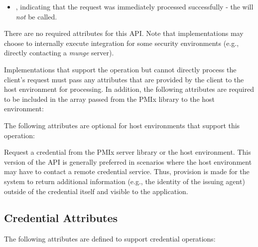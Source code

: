 \returnsimplenb

\returnstart
\begin{itemize}
\item {}, indicating that the request was immediately processed successfully - the  will \textit{not} be called.
\end{itemize}
\returnend

\reqattrstart
There are no required attributes for this \ac{API}. Note that implementations may choose to internally
execute integration for some security environments (e.g., directly
contacting a \textit{munge} server).

Implementations that support the operation but cannot directly process the client's request must pass any attributes that are provided by the client to the host environment for processing. In addition, the following attributes are required to be included in the  array passed from the \ac{PMIx} library to the host environment:


\reqattrend

\optattrstart
The following attributes are optional for host environments that support this operation:


\optattrend

\descr

Request a credential from the \ac{PMIx} server library or the host environment.  This version of the \ac{API} is generally preferred in scenarios where the host environment may have to contact a remote credential service. Thus, provision is made for the system to return additional information (e.g., the identity of the issuing agent) outside of the credential itself and visible to the application.

\subsection{Credential Attributes}
\label{chap:api_security:attributes}

The following attributes are defined to support credential operations:

%
%


